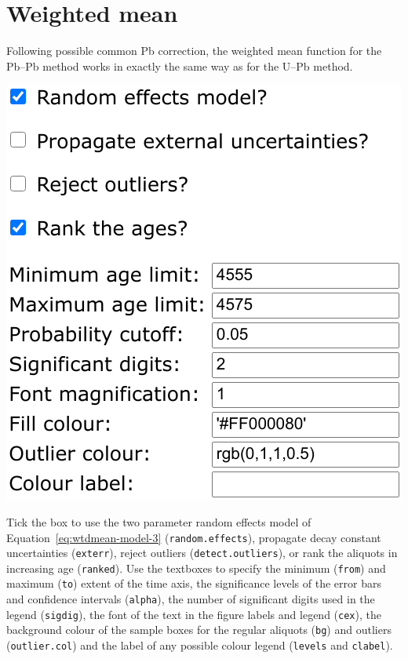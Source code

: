 \begin{refsection}
\begin{enumerate}
\end{enumerate}

\section{Weighted mean}\label{sec:PbPbWtdMean}

Following possible common Pb correction, the weighted mean function
for the Pb--Pb method works in exactly the same way as for the U--Pb
method.\\

\noindent\begin{minipage}[t]{.4\linewidth}
\strut\vspace*{-\baselineskip}\newline
\includegraphics[width=\linewidth]{../figures/PbPbWeightedMeanOptions.png}
\end{minipage}
\begin{minipage}[t]{.6\linewidth}
  Tick the box to use the two parameter random effects model of
  Equation~\ref{eq:wtdmean-model-3} (\texttt{random.effects}),
  propagate decay constant uncertainties (\texttt{exterr}), reject
  outliers (\texttt{detect.outliers}), or rank the aliquots in
  increasing age (\texttt{ranked}). Use the textboxes to specify the
  minimum (\texttt{from}) and maximum (\texttt{to}) extent of the time
  axis, the significance levels of the error bars and confidence
  intervals (\texttt{alpha}), the number of significant digits used in
  the legend (\texttt{sigdig}), the font of the text in the figure
  labels and legend (\texttt{cex}), the background colour of the
  sample boxes for the regular aliquots (\texttt{bg}) and outliers
  (\texttt{outlier.col}) and the label of any possible colour legend
  (\texttt{levels} and \texttt{clabel}).
\end{minipage}


\end{refsection}

